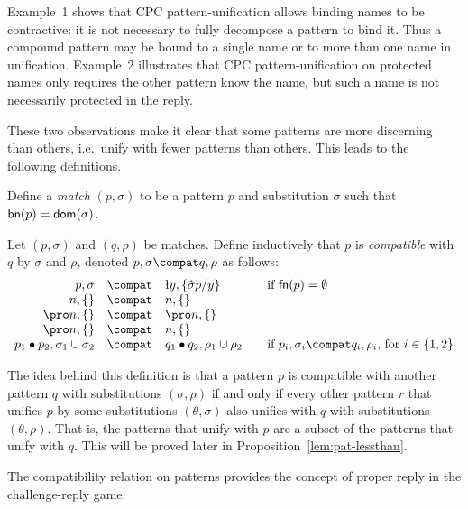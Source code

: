 \documentclass{LMCS}
\begin{document}
\medskip

Example~1 shows that CPC pattern-unification allows binding names to be contractive: 
it is not necessary to fully decompose a pattern to bind it.
Thus a compound pattern may be bound to a single name or to more than one name in unification.
Example~2 illustrates that CPC pattern-unification on protected names only requires the other pattern know the name, but such a name is not necessarily protected in the reply.

These two observations make it clear that some patterns are more discerning than others,
i.e.\ unify with fewer patterns than others. This leads to the following definitions.

\begin{defi}
\label{def:match}
Define a {\em match} $(p,\sigma)$ to be a pattern $p$ and substitution $\sigma$ such that
${\sf bn}(p)={\sf dom}(\sigma)$.
\end{defi}

\begin{defi}
\label{def:compat}
Let $(p,\sigma)$ and $(q,\rho)$ be matches.
Define inductively that $p$ is {\em compatible} with $q$ by $\sigma$ and $\rho$, 
denoted $p,\sigma\compat q,\rho$ as follows:
$$
\begin{array}{rcll}
p,\sigma &\compat& \l y,\{\hat\sigma p/y\} & \mbox{if } {\sf fn}(p)=\emptyset\\
n,\{\} &\compat& n,\{\}\\
\pro n ,\{\} &\compat& \pro n ,\{\}\\
\pro n ,\{\}&\compat& n,\{\}\\
p_1\bullet p_2,\sigma_1\cup\sigma_2 &\compat& q_1\bullet q_2,\rho_1\cup\rho_2
                \quad&  \mbox{if } p_i,\sigma_i\compat q_i,\rho_i \mbox{, for } i \in \{1,2\}
\end{array}
$$
\end{defi}

The idea behind this definition is that a pattern $p$ is compatible
with another pattern $q$ with substitutions $(\sigma,\rho)$ if and only if every other pattern $r$ that
unifies $p$ by some substitutions $(\theta,\sigma)$ also unifies with
$q$ with substitutions $(\theta,\rho)$.
That is, the patterns that unify with $p$ are a subset of
the patterns that unify with $q$.  This will be proved later in
Proposition~\ref{lem:pat-lessthan}.

The compatibility relation on patterns provides the concept of proper reply in the challenge-reply game.
\end{document}
